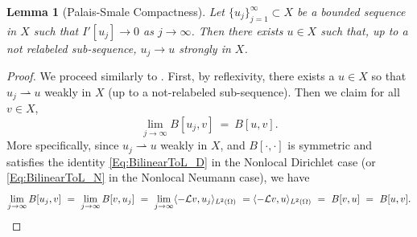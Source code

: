 \documentclass[11pt]{amsart}   	%
\theoremstyle{plain}
\numberwithin{equation}{section}
\newtheorem{lemma}[thm]{Lemma}
\def\Om{\Omega}
\def\lang{\langle}
\def\rang{\rangle}
\def\Lin{\mathcal{L}}
\begin{document}
\begin{lemma}[Palais-Smale Compactness]\label{Lem: PalaisSmale}
    Let $\{u_j\}^{\infty}_{j = 1} \subset X$ be a bounded sequence in $X$ such that $I'[u_j] \rightarrow 0$ as $j \rightarrow \infty$. Then there exists $u \in X$ such that, up to a not relabeled sub-sequence, $u_j \rightarrow u$ strongly in $X$.
\end{lemma}

\begin{proof} We proceed similarly to \cite[Proposition 12]{servadei2012mountain}. First, by reflexivity, there exists a $u \in X$ so that $u_j \rightharpoonup u$ weakly in $X$ (up to a not-relabeled sub-sequence). Then we claim for all $v \in X$,
\begin{equation}\label{Eq: WeakConvergenceB}
\lim_{j \to \infty} B[u_j, v] \ = \ B[u,v].
\end{equation}
More specifically, since $u_j \rightharpoonup u$ weakly in $X$, and $B[\cdot, \cdot]$ is symmetric and satisfies the identity \eqref{Eq:BilinearToL_D} in the Nonlocal Dirichlet case (or \eqref{Eq:BilinearToL_N} in the Nonlocal Neumann case), we have
\begin{equation}\label{Eq: ClosednessAdmissibleEq1A}
             \lim_{j \rightarrow \infty}B[u_j, v] \ = \ \lim_{j \rightarrow \infty}B[v, u_j] \ = \ \lim_{j \rightarrow \infty}\lang -\Lin v, u_j\rang_{L^2(\Om)} \ = \ \\
             \lang -\Lin v, u\rang_{L^2(\Om)} \ = \ B[v, u] \ = \ B[u, v] .
\end{equation}



\end{proof}
\end{document}
